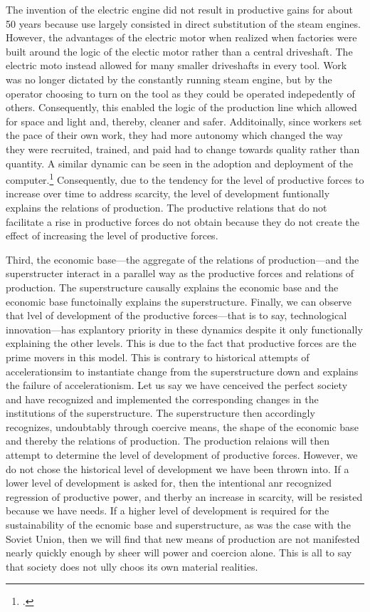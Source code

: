 \documentclass[letterpaper,notitlepage,12pt]{article}
\begin{document}
The invention of the electric engine did not result in productive gains for
about 50 years because use largely consisted in direct substitution of the steam
engines.
However, the advantages of the electric motor when realized when factories were
built around the logic of the electic motor rather than a central driveshaft.
The electric moto instead allowed for many smaller driveshafts in every tool.
Work was no longer dictated by the constantly running steam engine, but by the
operator choosing to turn on the tool as they could be operated indepedently of
others.
Consequently, this enabled the logic of the production line which allowed for
space and light and, thereby, cleaner and safer.
Additoinally, since workers set the pace of their own work, they had more
autonomy which changed the way they were recruited, trained, and paid had to
change towards quality rather than quantity.
A similar dynamic can be seen in the adoption and deployment of the
computer.\footcite{david_dynamo_1990}
Consequently, due to the tendency for the level of productive forces to increase
over time to address scarcity, the level of development funtionally explains the
relations of production.
The productive relations that do not facilitate a rise in productive forces do
not obtain because they do not create the effect of increasing the level of
productive forces.

Third, the economic base---the aggregate of the relations of production---and
the superstructer interact in a parallel way as the productive forces and
relations of production.
The superstructure causally explains the economic base and the economic base
functoinally explains the superstructure.
Finally, we can observe that lvel of development of the productive forces---that
is to say, technological innovation---has explantory priority in these dynamics
despite it only functionally explaining the other levels.
This is due to the fact that productive forces are the prime movers in this
model.
This is contrary to historical attempts of accelerationsim to instantiate change
from the superstructure down and explains the failure of accelerationism.
Let us say we have cenceived the perfect society and have recognized and
implemented the corresponding changes in the institutions of the superstructure.
The superstructure then accordingly recognizes, undoubtably through coercive
means, the shape of the economic base and thereby the relations of production.
The production relaions will then attempt to determine the level of development
of productive forces.
However, we do not chose the historical level of development we have been thrown
into.
If a lower level of development is asked for, then the intentional anr
recognized regression of productive power, and therby an increase in scarcity,
will be resisted because we have needs.
If a higher level of development is required for the sustainability of the
ecnomic base and superstructure, as was the case with the Soviet Union, then we
will find that new means of production are not manifested nearly quickly enough
by sheer will power and coercion alone.
This is all to say that society does not ully choos its own material realities.
\end{document}
